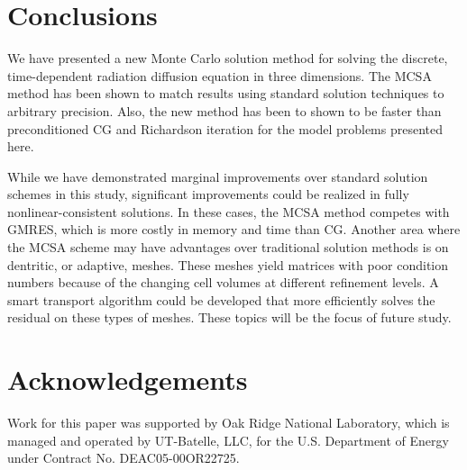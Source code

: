 \documentclass[preprint,12pt]{elsarticle}
\begin{document}
\section{Conclusions}
\label{sec:conclusions}

We have presented a new Monte Carlo solution method for solving the discrete,
time-dependent radiation diffusion equation in three dimensions.  The MCSA
method has been shown to match results using standard solution techniques to
arbitrary precision. Also, the new method has been to shown to be faster than
preconditioned CG and Richardson iteration for the model problems presented
here.

While we have demonstrated marginal improvements over standard solution
schemes in this study, significant improvements could be realized in fully
nonlinear-consistent solutions.  In these cases, the MCSA method competes with
GMRES, which is more costly in memory and time than CG.  Another area where
the MCSA scheme may have advantages over traditional solution methods is on
dentritic, or adaptive, meshes.  These meshes yield matrices with poor
condition numbers because of the changing cell volumes at different refinement
levels.  A smart transport algorithm could be developed that more efficiently
solves the residual on these types of meshes.  These topics will be the focus
of future study.

\section*{Acknowledgements}

Work for this paper was supported by Oak Ridge National Laboratory, which is
managed and operated by UT-Batelle, LLC, for the U.S. Department of Energy under
Contract No. DEAC05-00OR22725.



\end{document}
